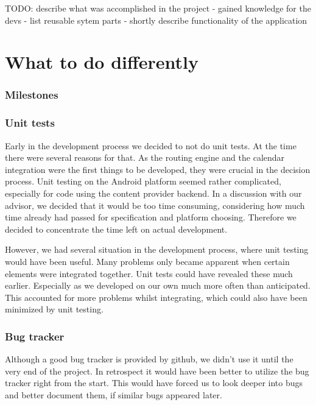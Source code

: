 TODO: describe what was accomplished in the project
- gained knowledge for the devs
- list reusable sytem parts
- shortly describe functionality of the application

\section{What to do differently} %
\label{sec:Whattododifferently}
\subsubsection{Milestones} %
\label{ssub:Milestones}

\subsubsection{Unit tests} %
\label{ssub:Unittests}
Early in the development process we decided to not do unit tests.
At the time there were several reasons for that.
As the routing engine and the calendar integration were the first
things to be developed, they were crucial in the decision process.
Unit testing on the Android platform seemed rather complicated,
especially for code using the content provider backend. In a discussion
with our advisor, we decided that it would be too time consuming,
considering how much time already had passed for specification and
platform choosing. Therefore we decided to concentrate the time left
on actual development.

However, we had several situation in the development process, where
unit testing would have been useful. Many problems only became
apparent when certain elements were integrated together. Unit tests
could have revealed these much earlier. Especially as we developed
on our own much more often than anticipated. This accounted for more
problems whilst integrating, which could also have been minimized by
unit testing.


\subsubsection{Bug tracker} %
\label{ssub:Bugtracker}
Although a good bug tracker is provided by github, we didn't use it
until the very end of the project. In retrospect it would have been
better to utilize the bug tracker right from the start. This would
have forced us to look deeper into bugs and better document them, if
similar bugs appeared later.


